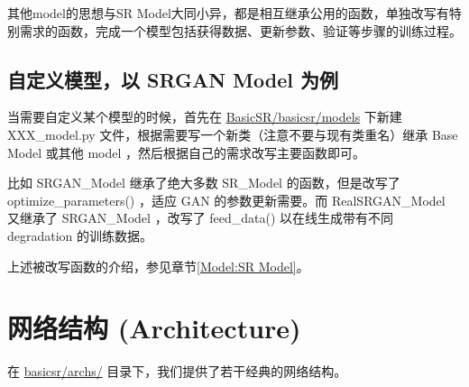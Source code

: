 \documentclass[../main.tex]{subfiles}
\begin{document}
其他model的思想与SR Model大同小异，都是相互继承公用的函数，单独改写有特别需求的函数，完成一个模型包括获得数据、更新参数、验证等步骤的训练过程。


\subsection{自定义模型，以 SRGAN Model 为例}

当需要自定义某个模型的时候，首先在 \href{https://github.com/XPixelGroup/BasicSR/blob/master/basicsr/models}{BasicSR/basicsr/models} 下新建 XXX\_model.py 文件，根据需要写一个新类（注意不要与现有类重名）继承 Base Model 或其他 model ，然后根据自己的需求改写主要函数即可。

比如 SRGAN\_Model 继承了绝大多数 SR\_Model 的函数，但是改写了 optimize\_parameters() ，适应 GAN 的参数更新需要。而 RealSRGAN\_Model 又继承了 SRGAN\_Model ，改写了 feed\_data() 以在线生成带有不同 degradation 的训练数据。

\begin{note} %
    上述被改写函数的介绍，参见章节\ref{Model:SR Model}。
\end{note}

\section{网络结构 (Architecture)} \label{code_structure:arch}
在 \href{https://github.com/XPixelGroup/BasicSR/tree/master/basicsr/archs}{basicsr/archs/} 目录下，我们提供了若干经典的网络结构。
\end{document}
